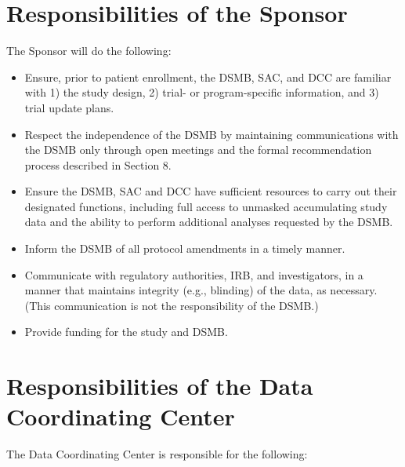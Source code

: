 \documentclass[12pt]{article}
\begin{document}
\section{Responsibilities of the Sponsor}
The Sponsor will do the following:
\begin{itemize}
\item Ensure, prior to patient enrollment, the DSMB, SAC, and DCC are familiar with 1) the study design, 2) trial- or program-specific information, and 3) trial update plans.
\item Respect the independence of the DSMB by maintaining communications with the DSMB only through open meetings and the formal recommendation process described in Section 8.
\item Ensure the DSMB, SAC and DCC have sufficient resources to carry out their designated functions, including full access to unmasked accumulating study data and the ability to perform additional analyses requested by the DSMB.
\item Inform the DSMB of all protocol amendments in a timely manner. 
\item Communicate with regulatory authorities, IRB, and investigators, in a manner that maintains integrity (e.g., blinding) of the data, as necessary. (This communication is not the responsibility of the DSMB.)
\item Provide funding for the study and DSMB.
\end{itemize}	

\section{Responsibilities of the Data Coordinating Center}
The Data Coordinating Center is responsible for the following:
\end{document}
